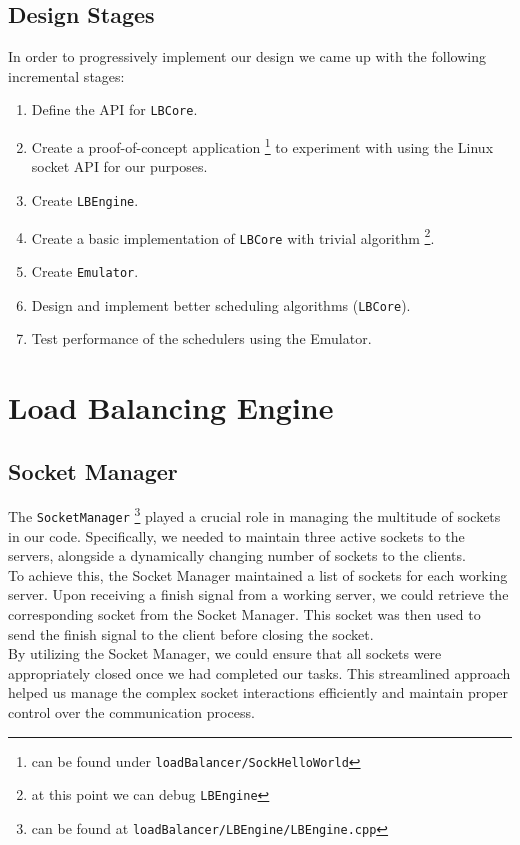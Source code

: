\documentclass{article}
\begin{document}
\subsection{Design Stages}
In order to progressively implement our design we came up with the following incremental stages:
\begin{enumerate}
    \item Define the API for \texttt{LBCore}.
    \item Create a proof-of-concept application
    \footnote{can be found under \texttt{loadBalancer/SockHelloWorld}}
    to experiment with using the Linux socket API for our purposes.
    \item Create \texttt{LBEngine}.
    \item Create a basic implementation of \texttt{LBCore} with trivial algorithm
    \footnote{at this point we can debug \texttt{LBEngine}}.
    \item Create \texttt{Emulator}.
    \item Design and implement better scheduling algorithms (\texttt{LBCore}).
    \item Test performance of the schedulers using the Emulator.
\end{enumerate}

\section{Load Balancing Engine}
\subsection{Socket Manager}
The \texttt{SocketManager}
\footnote{can be found at \texttt{loadBalancer/LBEngine/LBEngine.cpp}}
played a crucial role in managing the multitude of sockets in our code.
Specifically, we needed to maintain three active sockets to the servers,
alongside a dynamically changing number of sockets to the clients.\\
To achieve this, the Socket Manager maintained a list of sockets for each working server.
Upon receiving a finish signal from a working server, we could retrieve the corresponding socket from the Socket Manager.
This socket was then used to send the finish signal to the client before closing the socket.\\
By utilizing the Socket Manager, we could ensure that all sockets were appropriately closed once we had completed our tasks.
This streamlined approach helped us manage the complex
socket interactions efficiently and maintain proper control over the communication process.
\end{document}
